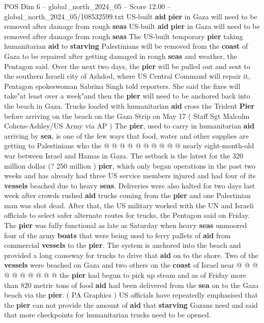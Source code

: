 \begin{textsample}{POS Dim 6 – global\_north\_2024\_05 – Score 12.00 – global\_north\_2024\_05/108532599.txt}  \label{ex:f6_pos_141}
US-built \textbf{aid} \textbf{pier} in Gaza will need to be removed after damage from rough \textbf{seas} US-built \textbf{aid} \textbf{pier} in Gaza will need to be removed after damage from rough \textbf{seas} The US-built temporary \textbf{pier} taking humanitarian \textbf{aid} to \textbf{starving} Palestinians will be removed from the \textbf{coast} of Gaza to be repaired after getting damaged in rough \textbf{seas} and weather, the Pentagon said.
Over the next two days, the \textbf{pier} will be pulled out and sent to the southern Israeli city of Ashdod, where US Central Command will repair it, Pentagon spokeswoman Sabrina Singh told reporters.
She said the fixes will take"at least over a week"and then the \textbf{pier} will need to be anchored back into the beach in Gaza.
Trucks loaded with humanitarian \textbf{aid} cross the Trident \textbf{Pier} before arriving on the beach on the Gaza Strip on May 17 ( Staff Sgt Malcolm Cohens-Ashley/US Army via AP ) The \textbf{pier}, used to carry in humanitarian \textbf{aid} arriving by \textbf{sea}, is one of the few ways that food, water and other supplies are getting to Palestinians who the @ @ @ @ @ @ @ @ @ @ nearly eight-month-old war between Israel and Hamas in Gaza.
The setback is the latest for the 320 million dollar (? 250 million ) \textbf{pier}, which only began operations in the past two weeks and has already had three US service members injured and had four of its \textbf{vessels} beached due to heavy \textbf{seas}.
Deliveries were also halted for two days last week after crowds rushed \textbf{aid} trucks coming from the \textbf{pier} and one Palestinian man was shot dead.
After that, the US military worked with the UN and Israeli officials to select safer alternate routes for trucks, the Pentagon said on Friday.
The \textbf{pier} was fully functional as late as Saturday when heavy \textbf{seas} unmoored four of the army \textbf{boats} that were being used to ferry pallets of \textbf{aid} from commercial \textbf{vessels} to the \textbf{pier}.
The system is anchored into the beach and provided a long causeway for trucks to drive that \textbf{aid} on to the shore.
Two of the \textbf{vessels} were beached on Gaza and two others on the \textbf{coast} of Israel near @ @ @ @ @ @ @ @ @ @ the \textbf{pier} had begun to pick up steam and as of Friday more than 820 metric tons of food \textbf{aid} had been delivered from the \textbf{sea} on to the Gaza beach via the \textbf{pier}. ( PA Graphics ) US officials have repeatedly emphasised that the \textbf{pier} can not provide the amount of \textbf{aid} that \textbf{starving} Gazans need and said that more checkpoints for humanitarian trucks need to be opened.

\end{textsample}
